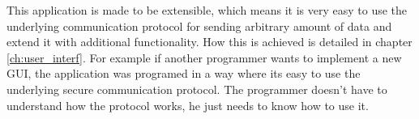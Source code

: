 This application is made to be extensible, which means it is very easy to use the underlying communication protocol for sending arbitrary amount of data and extend it with additional functionality. How this is achieved is detailed in chapter \ref{ch:user_interf}. For example if another programmer wants to implement a new GUI, the application was programed in a way where its easy to use the underlying secure communication protocol. The programmer doesn't have to understand how the protocol works, he just needs to know how to use it.
